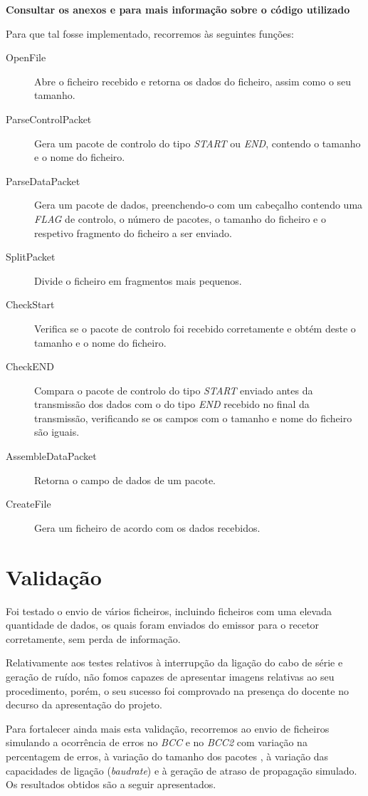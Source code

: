 \documentclass[11pt]{article}
\begin{document}
\textbf{Consultar os anexos  e  para mais informação sobre o código utilizado }

Para que tal fosse implementado, recorremos às seguintes funções:

\begin{description}
	\item[OpenFile] Abre o ficheiro recebido e retorna os dados do ficheiro, assim como o seu tamanho.
	\item[ParseControlPacket] Gera um pacote de controlo do tipo \textit{START} ou \textit{END}, contendo o tamanho e o nome do ficheiro.
	\item[ParseDataPacket] Gera um pacote de dados, preenchendo-o com um cabeçalho contendo uma \textit{FLAG} de controlo, o número de pacotes, o tamanho do ficheiro e o respetivo fragmento do ficheiro a ser enviado.
	\item[SplitPacket] Divide o ficheiro em fragmentos mais pequenos.
	\item[CheckStart] Verifica se o pacote de controlo foi recebido corretamente e obtém deste o tamanho e o nome do ficheiro.
	\item[CheckEND] Compara o pacote de controlo do tipo \textit{START} enviado antes da transmissão dos dados com o do tipo \textit{END} recebido no final da transmissão, verificando se os campos com o tamanho e nome do ficheiro são iguais.
	\item[AssembleDataPacket] Retorna o campo de dados de um pacote.
	\item[CreateFile] Gera um ficheiro de acordo com os dados recebidos.
\end{description}


\section{Validação}

Foi testado o envio de vários ficheiros, incluindo ficheiros com uma elevada quantidade de dados, os quais foram enviados do emissor para o recetor corretamente, sem perda de informação.

Relativamente aos testes relativos à interrupção da ligação do cabo de série e geração de ruído, não fomos capazes de apresentar imagens relativas ao seu procedimento, porém, o seu sucesso foi comprovado na presença do docente no decurso da apresentação do projeto.

Para fortalecer ainda mais esta validação, recorremos ao envio de ficheiros simulando a ocorrência de erros no \textit{BCC} e no \textit{BCC2} com variação na percentagem de erros, à variação do tamanho dos pacotes , à variação das capacidades de ligação (\textit{baudrate}) e à geração de atraso de propagação simulado. Os resultados obtidos são a seguir apresentados.  
\end{document}
